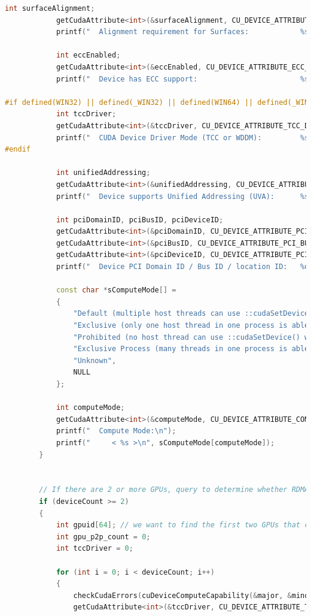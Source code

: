 \documentclass{scrreprt}
\begin{document}
\begin{lstlisting}[language=C++, caption=deviceQueryDrv.h]
			int surfaceAlignment;
			getCudaAttribute<int>(&surfaceAlignment, CU_DEVICE_ATTRIBUTE_SURFACE_ALIGNMENT, dev);
			printf("  Alignment requirement for Surfaces:            %s\n", surfaceAlignment ? "Yes" : "No");

			int eccEnabled;
			getCudaAttribute<int>(&eccEnabled, CU_DEVICE_ATTRIBUTE_ECC_ENABLED, dev);
			printf("  Device has ECC support:                        %s\n", eccEnabled ? "Enabled" : "Disabled");

#if defined(WIN32) || defined(_WIN32) || defined(WIN64) || defined(_WIN64)
			int tccDriver;
			getCudaAttribute<int>(&tccDriver, CU_DEVICE_ATTRIBUTE_TCC_DRIVER, dev);
			printf("  CUDA Device Driver Mode (TCC or WDDM):         %s\n", tccDriver ? "TCC (Tesla Compute Cluster Driver)" : "WDDM (Windows Display Driver Model)");
#endif

			int unifiedAddressing;
			getCudaAttribute<int>(&unifiedAddressing, CU_DEVICE_ATTRIBUTE_UNIFIED_ADDRESSING, dev);
			printf("  Device supports Unified Addressing (UVA):      %s\n", unifiedAddressing ? "Yes" : "No");

			int pciDomainID, pciBusID, pciDeviceID;
			getCudaAttribute<int>(&pciDomainID, CU_DEVICE_ATTRIBUTE_PCI_DOMAIN_ID, dev);
			getCudaAttribute<int>(&pciBusID, CU_DEVICE_ATTRIBUTE_PCI_BUS_ID, dev);
			getCudaAttribute<int>(&pciDeviceID, CU_DEVICE_ATTRIBUTE_PCI_DEVICE_ID, dev);
			printf("  Device PCI Domain ID / Bus ID / location ID:   %d / %d / %d\n", pciDomainID, pciBusID, pciDeviceID);

			const char *sComputeMode[] =
			{
				"Default (multiple host threads can use ::cudaSetDevice() with device simultaneously)",
				"Exclusive (only one host thread in one process is able to use ::cudaSetDevice() with this device)",
				"Prohibited (no host thread can use ::cudaSetDevice() with this device)",
				"Exclusive Process (many threads in one process is able to use ::cudaSetDevice() with this device)",
				"Unknown",
				NULL
			};

			int computeMode;
			getCudaAttribute<int>(&computeMode, CU_DEVICE_ATTRIBUTE_COMPUTE_MODE, dev);
			printf("  Compute Mode:\n");
			printf("     < %s >\n", sComputeMode[computeMode]);
		}


		// If there are 2 or more GPUs, query to determine whether RDMA is supported
		if (deviceCount >= 2)
		{
			int gpuid[64]; // we want to find the first two GPUs that can support P2P
			int gpu_p2p_count = 0;
			int tccDriver = 0;

			for (int i = 0; i < deviceCount; i++)
			{
				checkCudaErrors(cuDeviceComputeCapability(&major, &minor, i));
				getCudaAttribute<int>(&tccDriver, CU_DEVICE_ATTRIBUTE_TCC_DRIVER, i);


\end{lstlisting}
\end{document}
